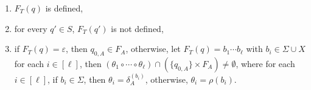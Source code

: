 \begin{itemize}
                            \begin{enumerate}
                                \item $F_T (q)$ is defined,
                                \item for every $q' \in S$, $F_T (q')$ is not defined,
                                \item if $F_T(q) = \varepsilon$, then $q_{0, A}  \in F_A$, otherwise, 
                                    let $F_T(q) = b_1 \cdots b_\ell$ with $b_i \in \Sigma \cup X$ for each $i \in [\ell]$, then $(\theta_1 \circ \cdots \circ \theta_\ell) \cap (\{q_{0,A}\} \times F_A) \neq \emptyset$, where for each $i \in [\ell]$, if $b_i \in \Sigma$, then $\theta_i = \delta^{(b_i)}_A$, otherwise, $\theta_i = \rho(b_i)$.
                            \end{enumerate}
                    \end{itemize}

